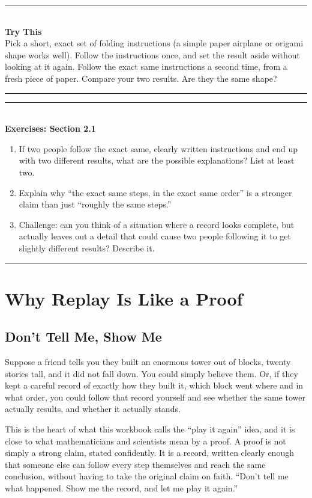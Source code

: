 \documentclass[11pt]{book}
\newenvironment{exercisebox}[1]{%
\vspace{0.8em}\noindent\rule{\linewidth}{0.6pt}\\[0.2em]\textbf{Exercises: #1}\\[0.3em]%
\begin{enumerate}[label=\arabic*., itemsep=0.4em]}%
{\end{enumerate}\noindent\rule{\linewidth}{0.6pt}\vspace{0.6em}}
\newenvironment{trythis}{%
\vspace{0.6em}\noindent\rule{\linewidth}{0.6pt}\\[0.2em]\textbf{Try This}\\[0.3em]}%
{\\[0.2em]\noindent\rule{\linewidth}{0.6pt}\vspace{0.6em}}
\begin{document}
\begin{trythis}
Pick a short, exact set of folding instructions (a simple paper airplane or origami shape works well). Follow the instructions once, and set the result aside without looking at it again. Follow the exact same instructions a second time, from a fresh piece of paper. Compare your two results. Are they the same shape?
\end{trythis}

\begin{exercisebox}{Section 2.1}
\item If two people follow the exact same, clearly written instructions and end up with two different results, what are the possible explanations? List at least two.
\item Explain why ``the exact same steps, in the exact same order'' is a stronger claim than just ``roughly the same steps.''
\item Challenge: can you think of a situation where a record looks complete, but actually leaves out a detail that could cause two people following it to get slightly different results? Describe it.
\end{exercisebox}

\chapter{Why Replay Is Like a Proof}

\section{Don't Tell Me, Show Me}

Suppose a friend tells you they built an enormous tower out of blocks, twenty stories tall, and it did not fall down. You could simply believe them. Or, if they kept a careful record of exactly how they built it, which block went where and in what order, you could follow that record yourself and see whether the same tower actually results, and whether it actually stands.

This is the heart of what this workbook calls the ``play it again'' idea, and it is close to what mathematicians and scientists mean by a proof. A proof is not simply a strong claim, stated confidently. It is a record, written clearly enough that someone else can follow every step themselves and reach the same conclusion, without having to take the original claim on faith. ``Don't tell me what happened. Show me the record, and let me play it again.''
\end{document}
